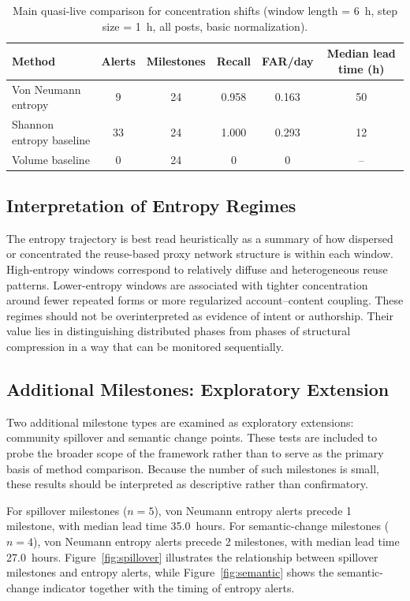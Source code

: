 \documentclass[sigconf]{acmart}
\begin{document}
\begin{table}[t]
\caption{Main quasi-live comparison for concentration shifts (window length = 6~h, step size = 1~h, all posts, basic normalization).}
\label{tab:maincomparison}
\centering
\scriptsize
\setlength{\tabcolsep}{3pt}
\renewcommand{\arraystretch}{1.05}
\begin{tabular}{lccccc}
\toprule
\textbf{Method} & \textbf{Alerts} & \textbf{Milestones} & \textbf{Recall} & \textbf{FAR/day} & \textbf{Median lead time (h)} \\
\midrule
Von Neumann entropy      & 9  & 24 & 0.958 & 0.163 & 50 \\
Shannon entropy baseline & 33 & 24 & 1.000 & 0.293 & 12 \\
Volume baseline          & 0  & 24 & 0     & 0     & -- \\
\bottomrule
\end{tabular}
\end{table}

\subsection{Interpretation of Entropy Regimes}

The entropy trajectory is best read heuristically as a summary of how dispersed or concentrated the reuse-based proxy network structure is within each window. High-entropy windows correspond to relatively diffuse and heterogeneous reuse patterns. Lower-entropy windows are associated with tighter concentration around fewer repeated forms or more regularized account--content coupling. These regimes should not be overinterpreted as evidence of intent or authorship. Their value lies in distinguishing distributed phases from phases of structural compression in a way that can be monitored sequentially.

\subsection{Additional Milestones: Exploratory Extension}

Two additional milestone types are examined as exploratory extensions: community spillover and semantic change points. These tests are included to probe the broader scope of the framework rather than to serve as the primary basis of method comparison. Because the number of such milestones is small, these results should be interpreted as descriptive rather than confirmatory.

For spillover milestones ($n = 5$), von Neumann entropy alerts precede 1 milestone, with median lead time 35.0~hours. For semantic-change milestones ($n = 4$), von Neumann entropy alerts precede 2 milestones, with median lead time 27.0~hours. Figure~\ref{fig:spillover} illustrates the relationship between spillover milestones and entropy alerts, while Figure~\ref{fig:semantic} shows the semantic-change indicator together with the timing of entropy alerts.
\end{document}

